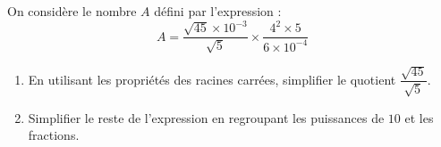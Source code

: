 \begin{exo}{}
	On considère le nombre $A$ défini par l'expression :
	\[ A = \frac{\sqrt{45} \times 10^{-3}}{\sqrt{5}} \times \frac{4^2 \times 5}{6 \times 10^{-4}} \]
	\begin{enumerate}
		\item En utilisant les propriétés des racines carrées, simplifier le quotient $\dfrac{\sqrt{45}}{\sqrt{5}}$.
		\item Simplifier le reste de l'expression en regroupant les puissances de $10$ et les fractions.
	\end{enumerate}
\end{exo}

